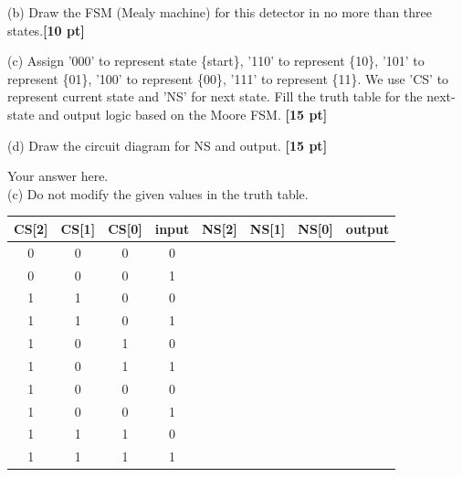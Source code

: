 \documentclass[a4paper]{article}
\begin{document}
(b) Draw the FSM (Mealy machine) for this detector in no more than three states.\textbf{[10 pt]}

(c) Assign '000' to represent state \{start\}, '110' to represent \{10\}, '101' to represent \{01\}, '100' to represent \{00\}, '111' to represent \{11\}. We use 'CS' to represent current state and 'NS' for next state. Fill the truth table for the next-state and output logic based on the Moore FSM. \textbf{[15 pt]}

(d) Draw the circuit diagram for NS and output. \textbf{[15 pt]}
\begin{answer}[Question 3]
    Your answer here. \\
    (c) Do not modify the given values in the truth table.\\
    \begin{center}
        \begin{tabular}{ |c|c|c|c||c|c|c|c| }
            \hline
            CS[2] & CS[1] & CS[0] & input & NS[2] & NS[1] & NS[0] & output \\
            \hline
            0     & 0     & 0     & 0     &       &       &       &        \\
            \hline
            0     & 0     & 0     & 1     &       &       &       &        \\
            \hline
            1     & 1     & 0     & 0     &       &       &       &        \\
            \hline
            1     & 1     & 0     & 1     &       &       &       &        \\
            \hline
            1     & 0     & 1     & 0     &       &       &       &        \\
            \hline
            1     & 0     & 1     & 1     &       &       &       &        \\
            \hline
            1     & 0     & 0     & 0     &       &       &       &        \\
            \hline
            1     & 0     & 0     & 1     &       &       &       &        \\
            \hline
            1     & 1     & 1     & 0     &       &       &       &        \\
            \hline
            1     & 1     & 1     & 1     &       &       &       &        \\
            \hline
        \end{tabular}
    \end{center}

\end{answer}
\end{document}
